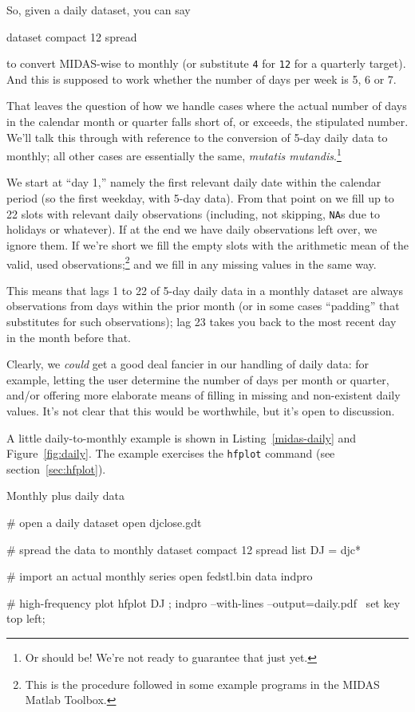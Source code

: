 \documentclass{article}
\begin{document}
So, given a daily dataset, you can say
%
\begin{code}
dataset compact 12 spread
\end{code}
%
to convert MIDAS-wise to monthly (or substitute \texttt{4} for
\texttt{12} for a quarterly target). And this is supposed to work
whether the number of days per week is 5, 6 or 7.

That leaves the question of how we handle cases where the actual
number of days in the calendar month or quarter falls short of, or
exceeds, the stipulated number. We'll talk this through with reference
to the conversion of 5-day daily data to monthly; all other cases are
essentially the same, \textit{mutatis mutandis}.\footnote{Or should
  be! We're not ready to guarantee that just yet.}

We start at ``day 1,'' namely the first relevant daily date within the
calendar period (so the first weekday, with 5-day data). From that
point on we fill up to 22 slots with relevant daily observations
(including, not skipping, \texttt{NA}s due to holidays or whatever).
If at the end we have daily observations left over, we ignore them. If
we're short we fill the empty slots with the arithmetic mean of the
valid, used observations;\footnote{This is the procedure followed in
  some example programs in the \textsf{MIDAS Matlab Toolbox}.} and we
fill in any missing values in the same way.

This means that lags 1 to 22 of 5-day daily data in a monthly dataset
are always observations from days within the prior month (or in some
cases ``padding'' that substitutes for such observations); lag 23
takes you back to the most recent day in the month before that.

Clearly, we \textit{could} get a good deal fancier in our handling of
daily data: for example, letting the user determine the number of days
per month or quarter, and/or offering more elaborate means of filling
in missing and non-existent daily values. It's not clear that this
would be worthwhile, but it's open to discussion.

A little daily-to-monthly example is shown in
Listing~\ref{midas-daily} and Figure~\ref{fig:daily}. The example
exercises the \texttt{hfplot} command (see section~\ref{sec:hfplot}).

\begin{script}[htbp]
  \caption{Monthly plus daily data}
  \label{midas-daily}
\begin{scode}
# open a daily dataset
open djclose.gdt

# spread the data to monthly
dataset compact 12 spread
list DJ = djc*

# import an actual monthly series
open fedstl.bin
data indpro

# high-frequency plot
hfplot DJ ; indpro --with-lines --output=daily.pdf \
 {set key top left;}
\end{scode}
\end{script}
\end{document}
